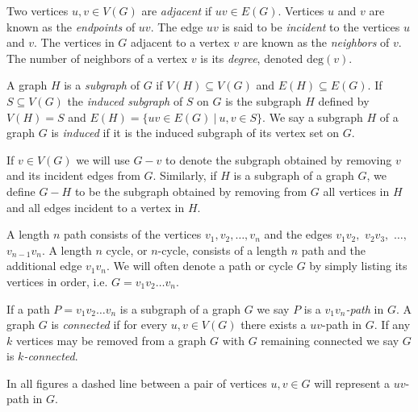 \documentclass[letterpaper, 12pt]{article}
\theoremstyle{definition}
\theoremstyle{definition}
\theoremstyle{thm}
\theoremstyle{definition}
\begin{document}
Two vertices $u,v\in V(G)$ are \textit{adjacent} if $uv\in E(G)$. Vertices $u$
and $v$ are known as the \textit{endpoints} of $uv$. The edge $uv$ is said to be
\textit{incident} to the vertices $u$ and $v$. The vertices in $G$ adjacent to a
vertex $v$ are known as the \textit{neighbors} of $v$. The number of neighbors
of a vertex $v$ is its \textit{degree}, denoted $\text{deg}(v)$.

A graph $H$ is a \textit{subgraph} of $G$ if $V(H)\subseteq V(G)$ and
$E(H)\subseteq E(G)$. If $S\subseteq V(G)$ the \textit{induced subgraph} of
$S$ on $G$ is the subgraph $H$ defined by $V(H)=S$ and
$E(H)=\{uv\in E(G) \ | \ u,v\in S\}$. We say a subgraph $H$ of a graph $G$ is
\textit{induced} if it is the induced subgraph of its vertex set on $G$.

If $v\in V(G)$ we will use $G-v$ to denote the subgraph obtained by removing $v$
and its incident edges from $G$. Similarly, if $H$ is a subgraph of a graph $G$,
we define $G-H$ to be the subgraph obtained by removing from $G$ all vertices in
$H$ and all edges incident to a vertex in $H$.

A length $n$ path consists of the vertices $v_1,v_2,\ldots,v_n$ and the edges
$v_1v_2,$ $v_2v_3,$ $\ldots,$ $v_{n-1}v_n$. A length $n$ cycle, or $n$-cycle, consists of
a length $n$ path and the additional edge $v_1v_n$. We will often denote a path
or cycle $G$ by simply listing its vertices in order, i.e. $G=v_1v_2\ldots v_n$.

If a path $P=v_1v_2\ldots v_n$ is a subgraph of a graph $G$ we say $P$ is a
\textit{$v_1v_n$-path} in $G$. A graph $G$ is \textit{connected} if for every
$u,v\in V(G)$ there exists a $uv$-path in $G$. If any $k$ vertices may be
removed from a graph $G$ with $G$ remaining connected we say $G$ is
\textit{$k$-connected}.

In all figures a dashed line between a pair of vertices $u,v\in G$ will
represent a $uv$-path in $G$.
\end{document}
